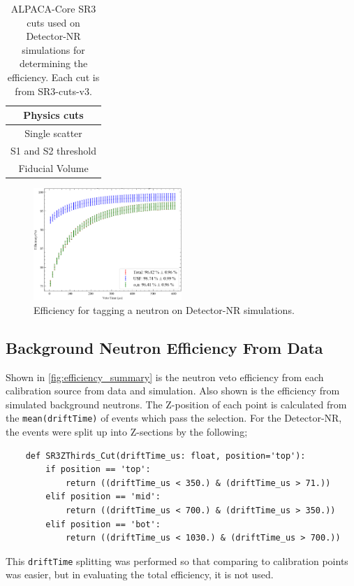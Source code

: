 \begin{table}
	\centering
	\begin{tabular}{c}
		Physics cuts        \\
		\hline
		Single scatter      \\
		S1 and S2 threshold \\
		Fiducial Volume
	\end{tabular}
	\caption{ALPACA-Core SR3 cuts used on Detector-NR simulations for determining the efficiency. Each cut is from SR3-cuts-v3.
	}
	\label{tab:detector_nr_simulation_efficiency_cuts}
\end{table}


\begin{figure}
	\centering
	\includegraphics[width=0.5\textwidth]{figures/VetoEfficiency/det_nr_efficiency.png}
	\caption{Efficiency for tagging a neutron on Detector-NR simulations.}
	\label{fig:detector_nr_efficiency}
\end{figure}

\clearpage
\subsection{Background Neutron Efficiency From Data}
Shown in \autoref{fig:efficiency_summary} is the neutron veto efficiency from each calibration source from data and simulation.
Also shown is the efficiency from simulated background neutrons.
The Z-position of each point is calculated from the \lstinline{mean(driftTime)} of events which pass the selection.
For the Detector-NR, the events were split up into Z-sections by the following;
\begin{lstlisting}
    def SR3ZThirds_Cut(driftTime_us: float, position='top'):
        if position == 'top':
            return ((driftTime_us < 350.) & (driftTime_us > 71.))
        elif position == 'mid':
            return ((driftTime_us < 700.) & (driftTime_us > 350.))
        elif position == 'bot':
            return ((driftTime_us < 1030.) & (driftTime_us > 700.))
\end{lstlisting}
This \lstinline{driftTime} splitting was performed so that comparing to calibration points was easier, but in evaluating the total efficiency, it is not used.

